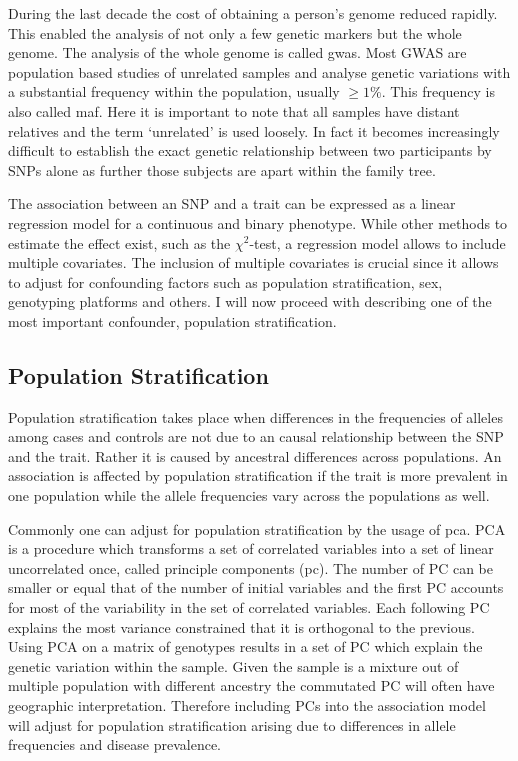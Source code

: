 During the last decade the cost of obtaining a person's genome reduced rapidly.
This enabled the analysis of not only a few genetic markers but the whole genome.
The analysis of the whole genome is called \acrfull{gwas}.
Most GWAS are population based studies of unrelated samples and analyse genetic variations with a substantial frequency within the population, usually $\ge 1\%$.
This frequency is also called \acrfull{maf}.
Here it is important to note that all samples have distant relatives and the term `unrelated' is used loosely.
In fact it becomes increasingly difficult to establish the exact genetic relationship between two participants by SNPs alone as further those subjects are apart within the family tree.

The association between an SNP and a trait can be expressed as a linear regression model for a continuous and binary phenotype.
While other methods to estimate the effect exist, such as the $\chi^2$-test, a regression model allows to include multiple covariates.
The inclusion of multiple covariates is crucial since it allows to adjust for confounding factors such as population stratification, sex, genotyping platforms and others.
I will now proceed with describing one of the most important confounder, population stratification.

\subsection{Population Stratification}
\label{ssec:population_stratification}
Population stratification takes place when differences in the frequencies of alleles among cases and controls are not due to an causal relationship between the SNP and the trait.
Rather it is caused by ancestral differences across populations.
An association is affected by population stratification if the trait is more prevalent in one population while the allele frequencies vary across the populations as well.

Commonly one can adjust for population stratification by the usage of \acrfull{pca}.
PCA is a procedure which transforms a set of correlated variables into a set of linear uncorrelated once, called principle components (\acrshort{pc}).
The number of PC can be smaller or equal that of the number of initial variables and the first PC accounts for most of the variability in the set of correlated variables.
Each following PC explains the most variance constrained that it is orthogonal to the previous.
Using PCA on a matrix of genotypes results in a set of PC which explain the genetic variation within the sample.
Given the sample is a mixture out of multiple population with different ancestry the commutated PC will often have geographic interpretation.
Therefore including PCs into the association model will adjust for population stratification arising due to differences in allele frequencies and disease prevalence.


